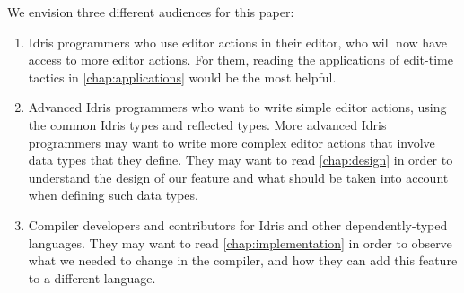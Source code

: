 We envision three different audiences for this paper:
\begin{enumerate}[(1)]
\item Idris programmers who use editor actions in their editor, who will now
  have access to more editor actions. For them, reading the applications of
edit-time tactics in \autoref{chap:applications} would be the most helpful.
\item Advanced Idris programmers who want to write simple editor actions, using
  the common Idris types and reflected types. More advanced Idris programmers
    may want to write more complex editor actions that involve data types
    that they define.
    They may want to read \autoref{chap:design} in order to understand the
    design of our feature and what should be taken into account when defining
    such data types.
\item Compiler developers and contributors for Idris and other
  dependently-typed languages.  They may want to read
    \autoref{chap:implementation} in order to observe what we needed to change
    in the compiler, and how they can add this feature to a different language.
\end{enumerate}
